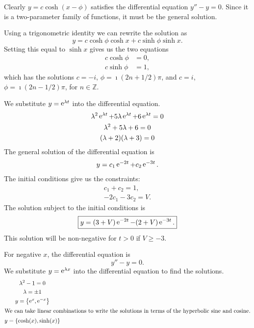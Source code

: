 {\begin{Solution}
  Clearly $y = c \cosh(x - \phi)$ satisfies the differential equation 
  $y'' - y = 0$.  Since it is a two-parameter family of functions, 
  it must be the general solution.

  Using a trigonometric identity we can rewrite the solution as
  \[
  y = c \cosh \phi \cosh x + c \sinh \phi \sinh x.
  \]
  Setting this equal to $\sinh x$ gives us the two equations
  \begin{align*}
    c \cosh \phi &= 0, \\
    c \sinh \phi &= 1,
  \end{align*}
  which has the solutions $c = -i$, $\phi = \imath (2 n + 1/2) \pi$, and 
  $c = i$, $\phi = \imath (2 n - 1/2) \pi$, for $n \in \mathbb{Z}$.
\end{Solution}







\begin{Solution}
  \label{solution y+5y+6y}
  We substitute $y = \mathop{\mathrm{e}}\nolimits^{\lambda t}$ into the differential equation.
  \begin{gather*}
    \lambda^2 \mathop{\mathrm{e}}\nolimits^{\lambda t} + 5 \lambda \mathop{\mathrm{e}}\nolimits^{\lambda t} + 6 \mathop{\mathrm{e}}\nolimits^{\lambda t} = 0 \\
    \lambda^2 + 5 \lambda + 6 = 0 \\
    (\lambda + 2)(\lambda + 3) = 0
  \end{gather*}
  The general solution of the differential equation is 
  \[
  y = c_1 \mathop{\mathrm{e}}\nolimits^{-2 t} + c_2 \mathop{\mathrm{e}}\nolimits^{-3 t}.
  \]
  The initial conditions give us the constraints:
  \begin{gather*}
    c_1 + c_2 = 1, \\
    -2 c_1 - 3 c_2 = V.
  \end{gather*}
  The solution subject to the initial conditions is
  \[
  \boxed{
    y = (3 + V) \mathop{\mathrm{e}}\nolimits^{-2 t} - (2 + V) \mathop{\mathrm{e}}\nolimits^{-3 t}.
    }
  \]
  This solution will be non-negative for $t > 0$ if $V \geq -3$.
\end{Solution}






\begin{Solution}
  \label{solution y+sign y}
  For negative $x$, the differential equation is
  \[
  y'' - y = 0.
  \]
  We substitute $y = \mathop{\mathrm{e}}\nolimits^{\lambda x}$ into the differential equation to find
  the solutions.
  \begin{gather*}
    \lambda^2 - 1 = 0 \\
    \lambda = \pm 1 \\
    y = \left\{ \mathop{\mathrm{e}}\nolimits^x, \mathop{\mathrm{e}}\nolimits^{-x} \right\} \\
    \intertext{We can take linear combinations to write the solutions in terms of
      the hyperbolic sine and cosine.}
    y = \left\{ \cosh(x), \sinh(x) \right\}
  \end{gather*}


\end{Solution}}
